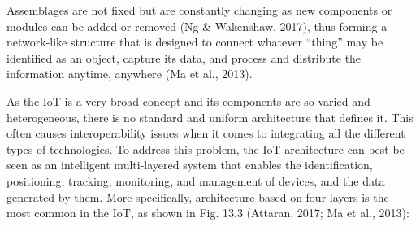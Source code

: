 \documentclass[
  letterpaper,
  DIV=11,
  numbers=noendperiod]{scrreprt}
\begin{document}
Assemblages are not fixed but are constantly changing as new components
or modules can be added or removed (Ng \& Wakenshaw, 2017), thus forming
a network-like structure that is designed to connect whatever ``thing''
may be identified as an object, capture its data, and process and
distribute the information anytime, anywhere (Ma et al., 2013).

As the IoT is a very broad concept and its components are so varied and
heterogeneous, there is no standard and uniform architecture that
defines it. This often causes interoperability issues when it comes to
integrating all the different types of technologies. To address this
problem, the IoT architecture can best be seen as an intelligent
multi-layered system that enables the identification, positioning,
tracking, monitoring, and management of devices, and the data generated
by them. More specifically, architecture based on four layers is the
most common in the IoT, as shown in Fig. 13.3 (Attaran, 2017; Ma et al.,
2013):
\end{document}
